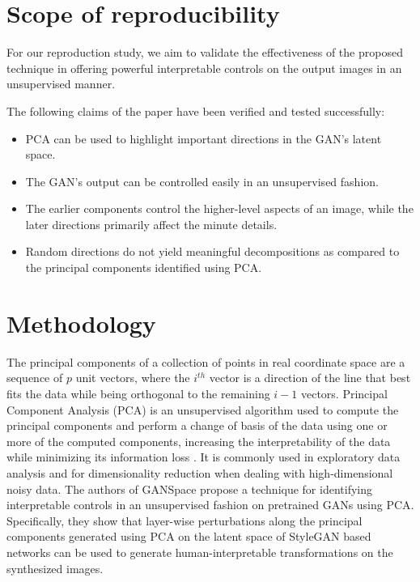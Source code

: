 \section{Scope of reproducibility}
\label{claims}


For our reproduction study, we aim to validate the effectiveness of the proposed technique in offering powerful interpretable controls on the output images in an unsupervised manner.

The following claims of the paper have been verified and tested successfully:
\begin{itemize}[noitemsep]
    \item PCA can be used to highlight important directions in the GAN's latent space.
    \item The GAN's output can be controlled easily in an unsupervised fashion.
    \item The earlier components control the higher-level aspects of an image, while the later directions primarily affect the minute details.
    \item Random directions do not yield meaningful decompositions as compared to the principal components identified using PCA.
\end{itemize}


\section{Methodology}

The principal components \cite{hotelling1933analysis} of a collection of points in real coordinate space are a sequence of $p$ unit vectors, where the $i^{th}$ vector is a direction of the line that best fits the data while being orthogonal to the remaining $i-1$ vectors. Principal Component Analysis (PCA) is an unsupervised algorithm used to compute the principal components and perform a change of basis of the data using one or more of the computed components, increasing the interpretability of the data while minimizing its information loss \cite{jolliffe2016principal}. It is commonly used in exploratory data analysis and for dimensionality reduction when dealing with high-dimensional noisy data. The authors of GANSpace propose a technique for identifying interpretable controls in an unsupervised fashion on pretrained GANs using PCA. Specifically, they show that layer-wise perturbations along the principal components generated using PCA on the latent space of StyleGAN based networks can be used to generate human-interpretable transformations on the synthesized images.

